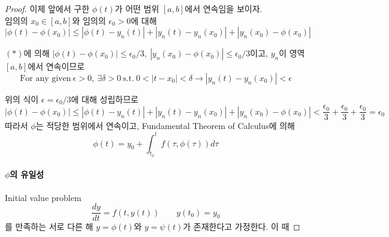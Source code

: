 \documentclass[a4paper,10pt]{article}
\begin{document}
\begin{proof}
    이제 앞에서 구한 $\phi(t)$가 어떤 범위 $[a, b]$에서 연속임을 보이자.\\
    
    임의의 $x_0 \in [a, b]$와 임의의 $\epsilon_0 > 0$에 대해
    \begin{displaymath}
      \left| \phi(t) - \phi(x_0) \right| \leq \left| \phi(t) - y_n(t) \right| + \left| y_n(t) - y_n(x_0) \right| + \left| y_n(x_0) - \phi(x_0) \right|
    \end{displaymath}
    
    $(\ast)$에 의해 $ \left| \phi(t) - \phi(x_0) \right| \leq \epsilon_0 / 3, \ \left| y_n(x_0) - \phi(x_0) \right| \leq \epsilon_0 / 3$이고, $y_n$이 영역 $[a,b]$에서 연속이므로
    \begin{displaymath}
      \text{For any given}\  \epsilon > 0,\ \exists \delta > 0 \ \text{s.t.} \ 0 < |t - x_0| < \delta \longrightarrow |y_n(t) - y_n(x_0)| < \epsilon 
    \end{displaymath}
    
    위의 식이 $\epsilon = \epsilon_0 / 3$에 대해 성립하므로
    \begin{displaymath}
      \left| \phi(t) - \phi(x_0) \right| \leq \left| \phi(t) - y_n(t) \right| + \left| y_n(t) - y_n(x_0) \right| + \left| y_n(x_0) - \phi(x_0) \right| < \frac{\epsilon_0}{3} + \frac{\epsilon_0}{3} + \frac{\epsilon_0}{3} = \epsilon_0
    \end{displaymath}
    따라서 $\phi$는 적당한 범위에서 연속이고, Fundamental Theorem of Calculus에 의해 
    \begin{displaymath}
      \phi(t) = y_0 + \int_{t_0}^{t}f(\tau, \phi(\tau)) d \tau
    \end{displaymath}
    
    \paragraph{$\phi$의 유일성}
    Initial value problem
    \begin{displaymath}
        \frac{dy}{dt} = f(t, y(t)) \qquad y(t_0) = y_0
    \end{displaymath}
    를 만족하는 서로 다른 해 $y = \phi(t)$와 $y = \psi(t)$가 존재한다고 가정한다. 이 때 %
    

\end{proof}
\end{document}
